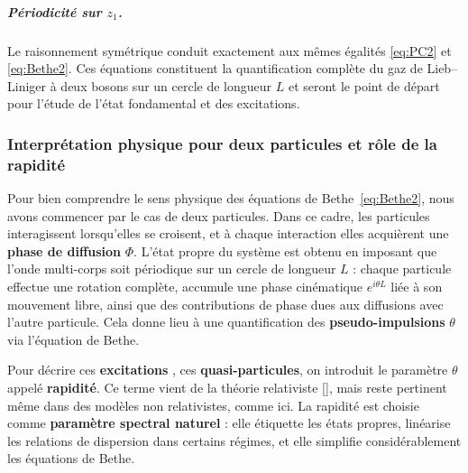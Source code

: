 \subparagraph{Périodicité sur $z_{1}$.}  Le raisonnement symétrique conduit exactement aux mêmes égalités \eqref{eq:PC2} et \eqref{eq:Bethe2}.  Ces équations  constituent la quantification complète du gaz de Lieb–Liniger à deux bosons sur un cercle de longueur $L$ et seront le point de départ pour l’étude de l’état fondamental et des excitations.



\begin{figure}[H]
	\centering
  \label{}	
\end{figure}

\subsubsection{Interprétation physique pour deux particules et rôle de la rapidité}

Pour bien comprendre le sens physique des équations de Bethe~\eqref{eq:Bethe2}, nous avons commencer par le cas de deux particules. Dans ce cadre, les particules interagissent lorsqu'elles se croisent, et à chaque interaction elles acquièrent une {\bf phase de diffusion} $\Phi$. L’état propre du système est obtenu en imposant que l’onde multi-corps soit périodique sur un cercle de longueur $L$ : chaque particule effectue une rotation complète, accumule une phase cinématique $e^{i\theta L}$ liée à son mouvement libre, ainsi que des contributions de phase dues aux diffusions avec l’autre particule. Cela donne lieu à une quantification des {\bf pseudo-impulsions} $\theta$ via l’équation de Bethe.

\medskip

Pour décrire ces {\bf excitations} , ces {\bf quasi-particules}, on introduit le paramètre $\theta$ appelé {\bf rapidité}. Ce terme vient de la théorie relativiste [\cite{zamolodchikov1979factorized}\cite{babelon2003introduction}], mais reste pertinent même dans des modèles non relativistes, comme ici. La rapidité est choisie comme {\bf paramètre spectral naturel} : elle étiquette les états propres, linéarise les relations de dispersion dans certains régimes, et elle simplifie considérablement les équations de Bethe.

